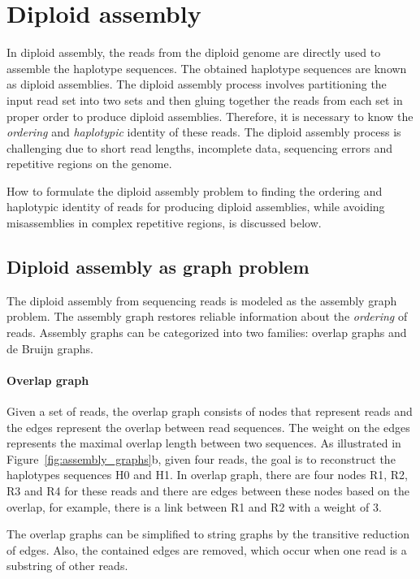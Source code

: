 \section{Diploid assembly}\label{sec:dip}
In diploid assembly, the reads from the diploid genome are directly used to assemble the haplotype sequences. The obtained haplotype sequences are known as diploid assemblies.
The diploid assembly process involves partitioning the input read set into two sets and then gluing together the reads from each set in proper order to produce diploid assemblies.
Therefore, it is necessary to know the \textit{ordering} and \textit{haplotypic} identity of these reads. 
The diploid assembly process is challenging due to short read lengths, incomplete data, sequencing errors and repetitive regions on the genome.

How to formulate the diploid assembly problem to finding the ordering and haplotypic identity of reads for producing diploid assemblies, while avoiding misassemblies in complex repetitive regions, is discussed below.

\subsection{Diploid assembly as graph problem}
The diploid assembly from sequencing reads is modeled as the assembly graph problem.
The assembly graph restores reliable information about the \textit{ordering} of reads.
Assembly graphs can be categorized into two families: overlap graphs and de Bruijn graphs.
\paragraph{Overlap graph}
Given a set of reads, the overlap graph consists of nodes that represent reads and the edges represent the overlap between read sequences.
The weight on the edges represents the maximal overlap length between two sequences. As illustrated in Figure~\ref{fig:assembly_graphs}b, 
given four reads, the goal is to reconstruct the haplotypes sequences H0 and H1.
In overlap graph, there are four nodes R1, R2, R3 and R4 for these reads and there are edges between these nodes based on the overlap, for example, there is a link between R1 and R2 with a weight of 3.

The overlap graphs can be simplified to string graphs by the transitive reduction of edges.
Also, the contained edges are removed, which occur when one read is a substring of other reads.

